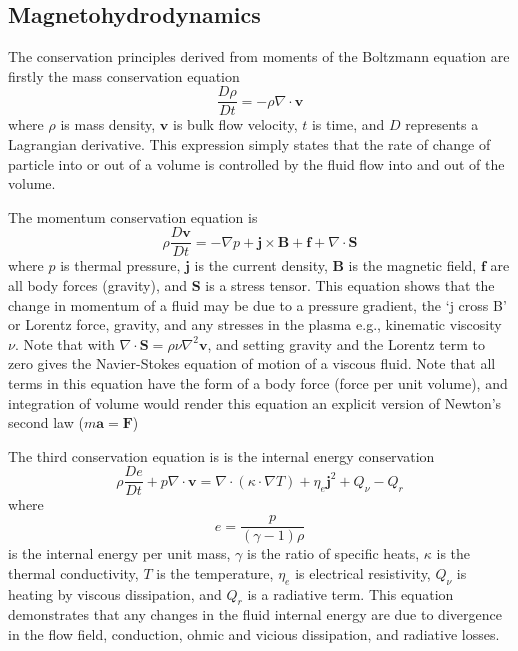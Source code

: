 \subsection{Magnetohydrodynamics}\label{sec:12}
The conservation principles  derived from moments of the Boltzmann equation are firstly the mass conservation equation
\begin{equation}
\frac{D\rho}{Dt} = -\rho\nabla\cdot \mathbf{v}
\end{equation}
where $\rho$ is mass density, $\mathbf{v}$ is bulk flow velocity, $t$ is time, and $D$ represents a Lagrangian derivative. This expression simply states that the rate of change of particle into or out of a volume is controlled by the fluid flow into and out of the volume.

The momentum conservation equation is
\begin{equation}
\rho\frac{D\mathbf{v}}{Dt}=-\nabla p + \mathbf{j}\times \mathbf{B} + \mathbf{f} +\nabla \cdot \mathbf{S}
\end{equation}
where $p$ is thermal pressure, $\mathbf{j}$ is the current density, $\mathbf{B}$ is the magnetic field, $\mathbf{f}$ are all body forces (gravity), and $\mathbf{S}$ is a stress tensor. This equation shows that the change in momentum of a fluid may be due to a pressure gradient, the \textquoteleft j cross B' or Lorentz force, gravity, and any stresses in the plasma e.g., kinematic viscosity $\nu$. Note that with $\nabla \cdot \mathbf{S}=\rho\nu\nabla^2\mathbf{v} $, and setting gravity and the Lorentz term to zero gives the Navier-Stokes equation of motion of a viscous fluid. Note that all terms in this equation have the form of a body force (force per unit volume), and integration of volume would render this equation an explicit version of Newton's second law ($m\mathbf{a}=\mathbf{F}$)

The third conservation equation is is the internal energy conservation
\begin{equation}
\rho\frac{De}{Dt} + p\nabla\cdot \mathbf{v}=\nabla\cdot(\kappa\cdot\nabla T) +  \eta_e\mathbf{j}^2 + Q_{\nu} - Q_r
\end{equation}
where 
\begin{equation}
e = \frac{p}{(\gamma-1)\rho}
\end{equation}
is the internal energy per unit mass, $\gamma$ is the ratio of specific heats, $\kappa$ is the thermal conductivity, $T$ is the temperature, $\eta_e$ is electrical resistivity, $Q_{\nu}$ is heating by viscous dissipation, and $Q_r$ is a radiative term. This equation demonstrates that any changes in the fluid internal energy are due to divergence in the flow field, conduction, ohmic and vicious dissipation, and radiative losses.

